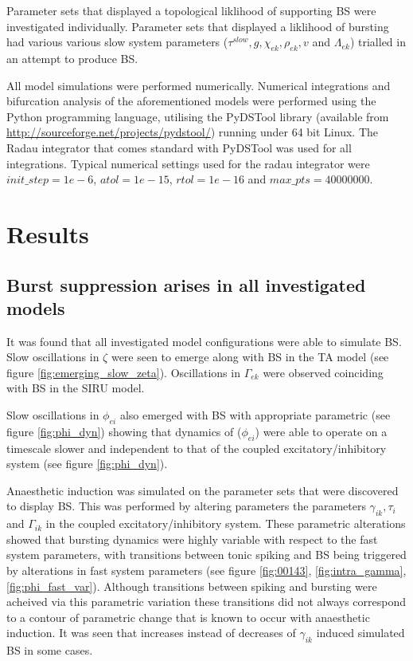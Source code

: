 \documentclass[a4paper,12pt]{article}
\begin{document}
Parameter sets that displayed a topological liklihood of supporting BS were investigated individually. Parameter sets that displayed a liklihood of bursting had various various slow system parameters ($\tau^{slow}, g, \chi_{ek}, \rho_{ek}, v$ and $\Lambda_{ek}$) trialled in an attempt to produce BS. 

All model simulations were performed numerically. Numerical integrations and bifurcation analysis of the aforementioned models were performed using the Python programming language, utilising
the PyDSTool library (available from \url{http://sourceforge.net/projects/pydstool/}) running under 64 bit
Linux. The Radau integrator that comes standard with PyDSTool was used for all integrations.
Typical numerical settings used for the radau integrator were $init\_step = 1e-6$, $atol = 1e-15$, $rtol = 1e-16$ and
$max\_pts = 40000000$.

\section{Results}

\subsection{Burst suppression arises in all investigated models}
It was found that all investigated model configurations were able to simulate BS. Slow oscillations in $\zeta$ were seen to emerge along with BS in the TA model (see figure \ref{fig:emerging_slow_zeta}). Oscillations in $\Gamma_{ek}$ were observed coinciding with BS in the SIRU model. 

Slow oscillations in $\phi_{ei}$ also emerged with BS with appropriate parametric (see figure \ref{fig:phi_dyn}) showing that dynamics of ($\phi_{ei}$) were able to operate on a timescale slower and independent to that of the coupled  excitatory/inhibitory system (see figure \ref{fig:phi_dyn}).

Anaesthetic induction was simulated on the parameter sets that were discovered to display BS. This was performed by altering parameters the parameters $\gamma_{ik}, \tau_i$ and $\Gamma_{ik}$ in the coupled excitatory/inhibitory system.  These parametric alterations showed that bursting dynamics were highly variable with respect to the fast system parameters, with transitions between tonic spiking and BS being triggered by alterations in fast system parameters (see figure \ref{fig:00143}, \ref{fig:intra_gamma}, \ref{fig:phi_fast_var}). Although transitions between spiking and bursting were acheived via this parametric variation these transitions did not always correspond to a contour of parametric change that is known to occur with anaesthetic induction. It was seen that increases instead of decreases of $\gamma_{ik}$ induced simulated BS in some cases.
\end{document}
